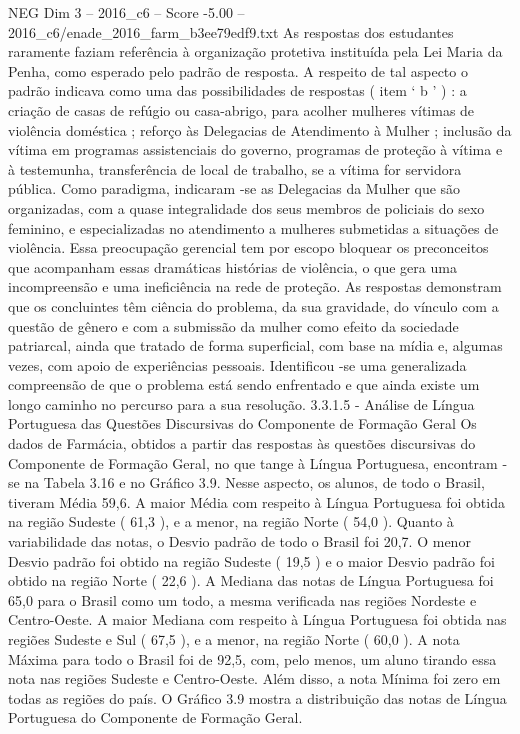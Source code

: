 \begin{textsample}{NEG Dim 3 – 2016\_c6 – Score -5.00 – 2016\_c6/enade\_2016\_farm\_b3ee79edf9.txt}
As respostas dos estudantes raramente faziam referência à organização protetiva instituída pela Lei Maria da Penha, como esperado pelo padrão de resposta.
A respeito de tal aspecto o padrão indicava como uma das possibilidades de respostas ( item ‘ b ’ ) : a criação de casas de refúgio ou casa-abrigo, para acolher mulheres vítimas de violência doméstica ; reforço às Delegacias de Atendimento à Mulher ; inclusão da vítima em programas assistenciais do governo, programas de proteção à vítima e à testemunha, transferência de local de trabalho, se a vítima for servidora pública.
Como paradigma, indicaram -se as Delegacias da Mulher que são organizadas, com a quase integralidade dos seus membros de policiais do sexo feminino, e especializadas no atendimento a mulheres submetidas a situações de violência.
Essa preocupação gerencial tem por escopo bloquear os preconceitos que acompanham essas dramáticas histórias de violência, o que gera uma incompreensão e uma ineficiência na rede de proteção.
As respostas demonstram que os concluintes têm ciência do problema, da sua gravidade, do vínculo com a questão de gênero e com a submissão da mulher como efeito da sociedade patriarcal, ainda que tratado de forma superficial, com base na mídia e, algumas vezes, com apoio de experiências pessoais.
Identificou -se uma generalizada compreensão de que o problema está sendo enfrentado e que ainda existe um longo caminho no percurso para a sua resolução. 3.3.1.5 - Análise de Língua Portuguesa das Questões Discursivas do Componente de Formação Geral Os dados de Farmácia, obtidos a partir das respostas às questões discursivas do Componente de Formação Geral, no que tange à Língua Portuguesa, encontram -se na Tabela 3.16 e no Gráfico 3.9.
Nesse aspecto, os alunos, de todo o Brasil, tiveram Média 59,6.
A maior Média com respeito à Língua Portuguesa foi obtida na região Sudeste ( 61,3 ), e a menor, na região Norte ( 54,0 ).
Quanto à variabilidade das notas, o Desvio padrão de todo o Brasil foi 20,7.
O menor Desvio padrão foi obtido na região Sudeste ( 19,5 ) e o maior Desvio padrão foi obtido na região Norte ( 22,6 ).
A Mediana das notas de Língua Portuguesa foi 65,0 para o Brasil como um todo, a mesma verificada nas regiões Nordeste e Centro-Oeste.
A maior Mediana com respeito à Língua Portuguesa foi obtida nas regiões Sudeste e Sul ( 67,5 ), e a menor, na região Norte ( 60,0 ).
A nota Máxima para todo o Brasil foi de 92,5, com, pelo menos, um aluno tirando essa nota nas regiões Sudeste e Centro-Oeste.
Além disso, a nota Mínima foi zero em todas as regiões do país.
O Gráfico 3.9 mostra a distribuição das notas de Língua Portuguesa do Componente de Formação Geral.

\end{textsample}
